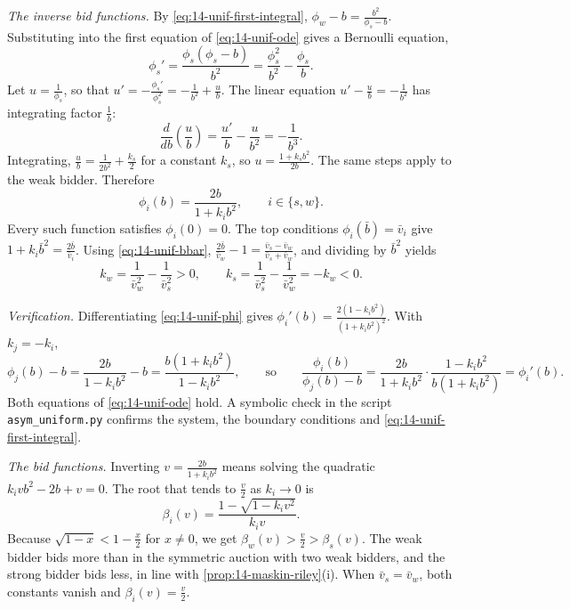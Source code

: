 \begin{example}
\emph{The inverse bid functions.} By \eqref{eq:14-unif-first-integral},
$\phi_w-b=\frac{b^2}{\phi_s-b}$. Substituting into the first equation of \eqref{eq:14-unif-ode}
gives a Bernoulli equation,
\[
\phi_s'=\frac{\phi_s(\phi_s-b)}{b^2}=\frac{\phi_s^2}{b^2}-\frac{\phi_s}{b}.
\]
Let $u=\frac{1}{\phi_s}$, so that $u'=-\frac{\phi_s'}{\phi_s^2}=-\frac{1}{b^2}+\frac{u}{b}$. The
linear equation $u'-\frac{u}{b}=-\frac{1}{b^2}$ has integrating factor $\frac{1}{b}$:
\[
\frac{d}{db}\left(\frac{u}{b}\right)=\frac{u'}{b}-\frac{u}{b^2}=-\frac{1}{b^3}.
\]
Integrating, $\frac{u}{b}=\frac{1}{2b^2}+\frac{k_s}{2}$ for a constant $k_s$, so
$u=\frac{1+k_sb^2}{2b}$. The same steps apply to the weak bidder. Therefore
\begin{equation}\label{eq:14-unif-phi}
\phi_i(b)=\frac{2b}{1+k_ib^2},\qquad i\in\{s,w\} .
\end{equation}
Every such function satisfies $\phi_i(0)=0$. The top conditions $\phi_i(\bar b)=\bar v_i$ give
$1+k_i\bar b^2=\frac{2\bar b}{\bar v_i}$. Using \eqref{eq:14-unif-bbar},
$\frac{2\bar b}{\bar v_w}-1=\frac{\bar v_s-\bar v_w}{\bar v_s+\bar v_w}$, and dividing by $\bar b^2$
yields
\begin{equation}\label{eq:14-unif-k}
k_w=\frac{1}{\bar v_w^2}-\frac{1}{\bar v_s^2}>0,\qquad k_s=\frac{1}{\bar v_s^2}-\frac{1}{\bar v_w^2}=-k_w<0 .
\end{equation}

\emph{Verification.} Differentiating \eqref{eq:14-unif-phi} gives
$\phi_i'(b)=\frac{2(1-k_ib^2)}{(1+k_ib^2)^2}$. With $k_j=-k_i$,
\[
\phi_j(b)-b=\frac{2b}{1-k_ib^2}-b=\frac{b(1+k_ib^2)}{1-k_ib^2},
\qquad\text{so}\qquad
\frac{\phi_i(b)}{\phi_j(b)-b}=\frac{2b}{1+k_ib^2}\cdot\frac{1-k_ib^2}{b(1+k_ib^2)}=\phi_i'(b).
\]
Both equations of \eqref{eq:14-unif-ode} hold. A symbolic check in the script
\texttt{asym\_uniform.py} confirms the system, the boundary conditions and
\eqref{eq:14-unif-first-integral}.

\emph{The bid functions.} Inverting $v=\frac{2b}{1+k_ib^2}$ means solving the quadratic
$k_ivb^2-2b+v=0$. The root that tends to $\frac{v}{2}$ as $k_i\to 0$ is
\begin{equation}\label{eq:14-unif-beta}
\beta_i(v)=\frac{1-\sqrt{1-k_iv^2}}{k_iv}.
\end{equation}
Because $\sqrt{1-x}<1-\frac{x}{2}$ for $x\neq 0$, we get $\beta_w(v)>\frac{v}{2}>\beta_s(v)$. The
weak bidder bids more than in the symmetric auction with two weak bidders, and the strong bidder bids
less, in line with \cref{prop:14-maskin-riley}(i). When $\bar v_s=\bar v_w$, both constants vanish
and $\beta_i(v)=\frac{v}{2}$.
\end{example}


